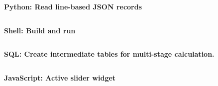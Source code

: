 \documentclass{article}
\newcommand{\heading}[1] {
\bigskip
\textrm{\bfseries #1}
}
\begin{document}

\heading{Python: Read line-based JSON records}
\inputminted{python}{read_json_lines.py}

\heading{Shell: Build and run}
\inputminted{sh}{build_and_run.sh}

\pagebreak

\heading{SQL: Create intermediate tables for multi-stage calculation.}
\inputminted{sql}{create_select.sql}

\pagebreak

\heading{JavaScript: Active slider widget}
\inputminted{js}{slider.js}
\end{document}
